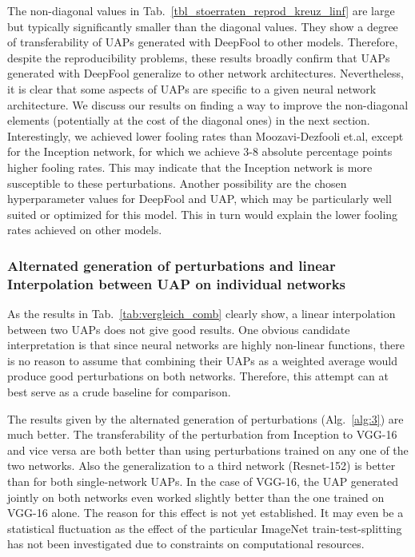 \documentclass[runningheads]{llncs}
\begin{document}
The non-diagonal values in Tab.~\ref{tbl_stoerraten_reprod_kreuz_linf} are large but typically significantly smaller than the diagonal values. They show a degree of transferability of UAPs generated with DeepFool to other models. Therefore, despite the reproducibility problems, these results broadly confirm that UAPs generated with DeepFool generalize to other network architectures. Nevertheless, it is clear that some aspects of UAPs are specific to a given neural network architecture. We discuss our results on finding a way to improve the non-diagonal elements (potentially at the cost of the diagonal ones) in the next section.
Interestingly, we achieved lower fooling rates than Moozavi-Dezfooli et.al, except for the Inception network, for which we achieve 3-8 absolute percentage points higher fooling rates. This may indicate that the Inception network is more susceptible to these perturbations. Another possibility are the chosen hyperparameter values for DeepFool and UAP, which may be particularly well suited or optimized for this model. This in turn would explain the lower fooling rates achieved on other models.

\subsubsection{Alternated generation of perturbations and linear Interpolation between UAP on individual networks}
As the results in Tab.~\ref{tab:vergleich_comb} clearly show, a linear interpolation between two UAPs does not give good results. One obvious candidate interpretation is that since neural networks are highly non-linear functions, there is no reason to assume that combining their UAPs as a weighted average would produce good perturbations on both networks. Therefore, this attempt can at best serve as a crude baseline for comparison. 

The results given by the alternated generation of perturbations (Alg.~\ref{alg:3}) are much better. The transferability of the perturbation from Inception to VGG-16 and vice versa are both better than using perturbations trained on any one of the two networks. Also the generalization to a third network (Resnet-152) is better than for both single-network UAPs. In the case of VGG-16, the UAP generated jointly on both networks even worked slightly better than the one trained on VGG-16 alone. The reason for this effect is not yet established. It may even be a statistical fluctuation as the effect of the particular ImageNet train-test-splitting has not been investigated due to constraints on computational resources. 
\end{document}
